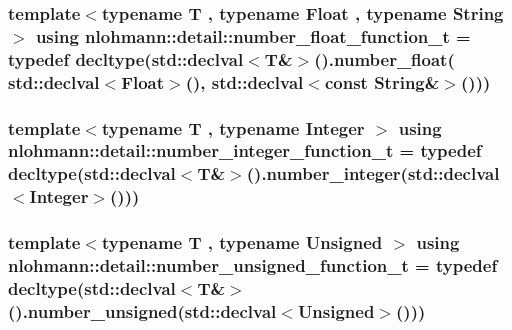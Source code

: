 \subsubsection[{\texorpdfstring{number\+\_\+float\+\_\+function\+\_\+t}{number_float_function_t}}]{\setlength{\rightskip}{0pt plus 5cm}template$<$typename T , typename Float , typename String $>$ using {\bf nlohmann\+::detail\+::number\+\_\+float\+\_\+function\+\_\+t} = typedef decltype(std\+::declval$<$T\&$>$().number\+\_\+float( std\+::declval$<$Float$>$(), std\+::declval$<$const String\&$>$()))}\hypertarget{namespacenlohmann_1_1detail_ad42df56e913abe26ed556e0e92f386f4}{}\label{namespacenlohmann_1_1detail_ad42df56e913abe26ed556e0e92f386f4}
\subsubsection[{\texorpdfstring{number\+\_\+integer\+\_\+function\+\_\+t}{number_integer_function_t}}]{\setlength{\rightskip}{0pt plus 5cm}template$<$typename T , typename Integer $>$ using {\bf nlohmann\+::detail\+::number\+\_\+integer\+\_\+function\+\_\+t} = typedef decltype(std\+::declval$<$T\&$>$().number\+\_\+integer(std\+::declval$<$Integer$>$()))}\hypertarget{namespacenlohmann_1_1detail_a4a3e14a011b9ea1ff849fc6d2411e6a0}{}\label{namespacenlohmann_1_1detail_a4a3e14a011b9ea1ff849fc6d2411e6a0}
\subsubsection[{\texorpdfstring{number\+\_\+unsigned\+\_\+function\+\_\+t}{number_unsigned_function_t}}]{\setlength{\rightskip}{0pt plus 5cm}template$<$typename T , typename Unsigned $>$ using {\bf nlohmann\+::detail\+::number\+\_\+unsigned\+\_\+function\+\_\+t} = typedef decltype(std\+::declval$<$T\&$>$().number\+\_\+unsigned(std\+::declval$<$Unsigned$>$()))}\hypertarget{namespacenlohmann_1_1detail_a74da7b17bda76f65d276feb18209c913}{}\label{namespacenlohmann_1_1detail_a74da7b17bda76f65d276feb18209c913}
